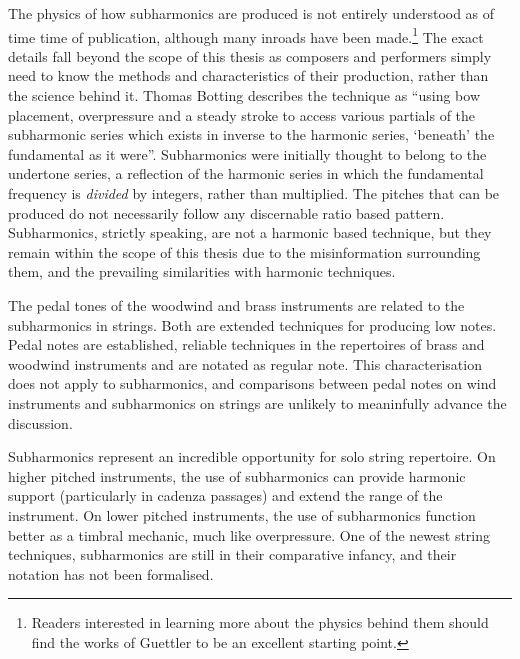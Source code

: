The physics of how subharmonics are produced is not entirely understood as of time time of publication, although many inroads have been made.\footnote{Readers interested in learning more about the physics behind them should find the works of Guettler to be an excellent starting point.}\autocite[]{guettlerBowedStringDevelopment2002}
The exact details fall beyond the scope of this thesis as composers and performers simply need to know the methods and characteristics of their production, rather than the science behind it.
Thomas Botting describes the technique as ``using bow placement, overpressure and a steady stroke to access various partials of the subharmonic series which exists in inverse to the harmonic series, ‘beneath’ the fundamental as it were''.\autocite[16]{bottingDevelopingPersonalVocabulary2019}
Subharmonics were initially thought to belong to the undertone series, a reflection of the harmonic series in which the fundamental frequency is \emph{divided} by integers, rather than multiplied.\autocite[]{shaahinmohajeriEqualdivisionsoflengthEdl240edo2019}
The pitches that can be produced do not necessarily follow any discernable ratio based pattern.\autocite[]{guettlerWaveAnalysisString1994}
Subharmonics, strictly speaking, are not a harmonic based technique, but they remain within the scope of this thesis due to the misinformation surrounding them, and the prevailing similarities with harmonic techniques.

The pedal tones of the woodwind and brass instruments are related to the subharmonics in strings.
Both are extended techniques for producing low notes. 
Pedal notes are established, reliable techniques in the repertoires of brass and woodwind instruments and are notated as regular note. 
This characterisation does not apply to subharmonics, and comparisons between pedal notes on wind instruments and subharmonics on strings are unlikely to meaninfully advance the discussion.

Subharmonics represent an incredible opportunity for solo string repertoire. 
On higher pitched instruments, the use of subharmonics can provide harmonic support (particularly in cadenza passages) and extend the range of the instrument. 
On lower pitched instruments, the use of subharmonics function better as a timbral mechanic, much like overpressure. 
One of the newest string techniques, subharmonics are still in their comparative infancy, and their notation has not been formalised. 

